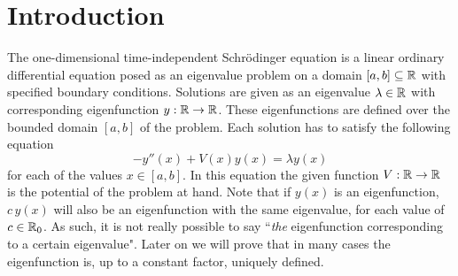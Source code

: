 

\label{cha:c2}

\section{Introduction}

The one-dimensional time-independent Schrödinger equation is a linear ordinary differential equation posed as an eigenvalue problem on a domain $[a, b] \subseteq \mathbb{R}$ with specified boundary conditions. Solutions are given as an eigenvalue $\lambda \in \mathbb{R}$ with corresponding eigenfunction $y: \mathbb{R} \to \mathbb{R}$. These eigenfunctions are defined over the bounded domain $[a, b]$ of the problem. Each solution has to satisfy the following equation
$$
    -y''(x) + V(x)y(x) = \lambda y(x)
$$
for each of the values $x\in [a, b]$. In this equation the given function $V: \mathbb{R} \to \mathbb{R}$ is the potential of the problem at hand. Note that if $y(x)$ is an eigenfunction, $c\,y(x)$ will also be an eigenfunction with the same eigenvalue, for each value of $c \in \mathbb{R}_0$. As such, it is not really possible to say ``\emph{the} eigenfunction corresponding to a certain eigenvalue". Later on we will prove that in many cases the eigenfunction is, up to a constant factor, uniquely defined.

